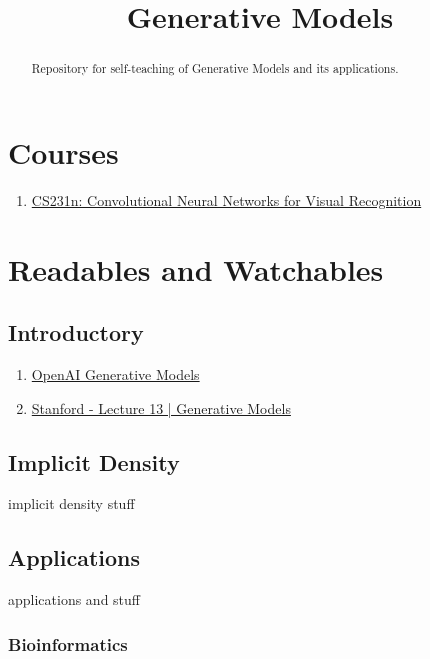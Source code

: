\documentclass[12pt]{article}
\begin{document}
\title{Generative Models}
\maketitle
\tableofcontents

\begin{abstract}
  Repository for self-teaching of Generative Models and its applications.
\end{abstract}

\section{Courses}
\begin{enumerate}
  \item \href{http://cs231n.stanford.edu/}{CS231n: Convolutional Neural Networks for Visual Recognition}
\end{enumerate}

\section{Readables and Watchables}
  \subsection{Introductory}
    \begin{enumerate}
      \item \href{https://openai.com/blog/generative-models/}{OpenAI Generative Models}
      \item \href{https://www.youtube.com/watch?v=5WoItGTWV54}{Stanford - Lecture 13 | Generative Models}
    \end{enumerate}

  \subsection{Implicit Density}
    implicit density stuff
    \nocite{goodfellow2014generative}

  \subsection{Applications}
    applications and stuff
    \subsubsection{Bioinformatics}
      \nocite{killoran2017generating}
\end{document}
